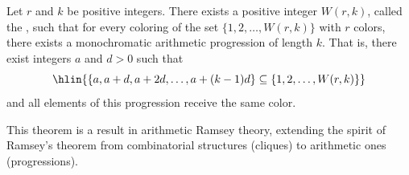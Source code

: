 \begin{theorem} \label{theorem:van_der_waerdens_theorem_on_arithmetic_progressions_in_finite_colorings_of_integers}
Let $r$ and $k$ be positive integers. There exists a positive integer $W(r,k)$, called the , such that for every coloring of the set $\{1, 2, \dots, W(r,k)\}$ with $r$ colors, there exists a monochromatic arithmetic progression of length $k$. That is, there exist integers $a$ and $d > 0$ such that
$$\hlin{\{a, a+d, a+2d, \dots, a+(k-1)d\} \subseteq \{1, 2, \dots, W(r,k)\}}$$
and all elements of this progression receive the same color.

This theorem is a result in arithmetic Ramsey theory, extending the spirit of Ramsey's theorem from combinatorial structures (cliques) to arithmetic ones (progressions).
\end{theorem}
